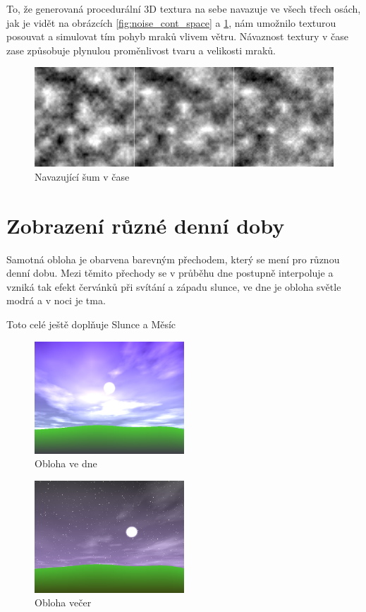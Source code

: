 \documentclass[12pt,a4paper,titlepage,final]{report}
\begin{document}
To, že generovaná procedurální 3D textura na sebe navazuje ve všech třech osách,
jak je vidět na obrázcích \ref{fig:noise_cont_space} a \ref{fig:noise_cont_time},
nám umožnilo texturou posouvat a simulovat tím pohyb mraků vlivem větru.
Návaznost textury v čase zase způsobuje plynulou proměnlivost tvaru a velikosti
mraků.

\begin{figure}[h] \centering
        \includegraphics[width=\textwidth]{images/sum123.png}
    \caption{Navazující šum v čase} \label{fig:noise_cont_time}
\end{figure}

\section{Zobrazení různé denní doby}

Samotná obloha je obarvena barevným přechodem, který se mení pro různou denní
dobu. Mezi těmito přechody se v průběhu dne postupně interpoluje a vzniká
tak efekt červánků při svítání a západu slunce, ve dne je obloha světle modrá
a v noci je tma.

Toto celé ještě doplňuje Slunce a Měsíc


\begin{figure}[h] \centering
        \includegraphics[width=0.5\textwidth]{images/sky0.png}
    \caption{Obloha ve dne} \label{fig:sky_day}
\end{figure}

\begin{figure}[h] \centering
        \includegraphics[width=0.5\textwidth]{images/sky1.png}
    \caption{Obloha večer} \label{fig:sky_evening}
\end{figure}
\end{document}
